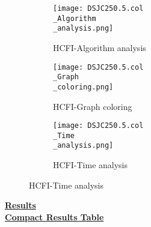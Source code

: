 \documentclass[10pt]{article}
\begin{document}
\graphicspath{{./Core1/Solutions/HCFI/DSJC250.5.col}}
\begin{figure}[H]
\begin{subfigure}{.33\textwidth}
  \centering
  \texttt{[image: DSJC250.5.col\\\_Algorithm\\\_analysis.png]}
  \caption{HCFI-Algorithm analysis}
   \label{fig:subfig1}
\end{subfigure}%
\begin{subfigure}{.33\textwidth}
  \centering
  \texttt{[image: DSJC250.5.col\\\_Graph\\\_coloring.png]}
  \caption{HCFI-Graph coloring}
  \label{fig:subfig2}
\end{subfigure}
\begin{subfigure}{.33\textwidth}
  \centering
  \texttt{[image: DSJC250.5.col\\\_Time\\\_analysis.png]}
  \caption{HCFI-Time analysis}
  \end{subfigure}
\end{figure}
\vspace{2cm}
\begin{center}
\hyperlink{page.8}{\textbf{Results}}\\
\vspace{0.5cm}
\hyperlink{page.71}{\textbf{Compact Results Table}}
\end{center}
\pagebreak
\end{document}
